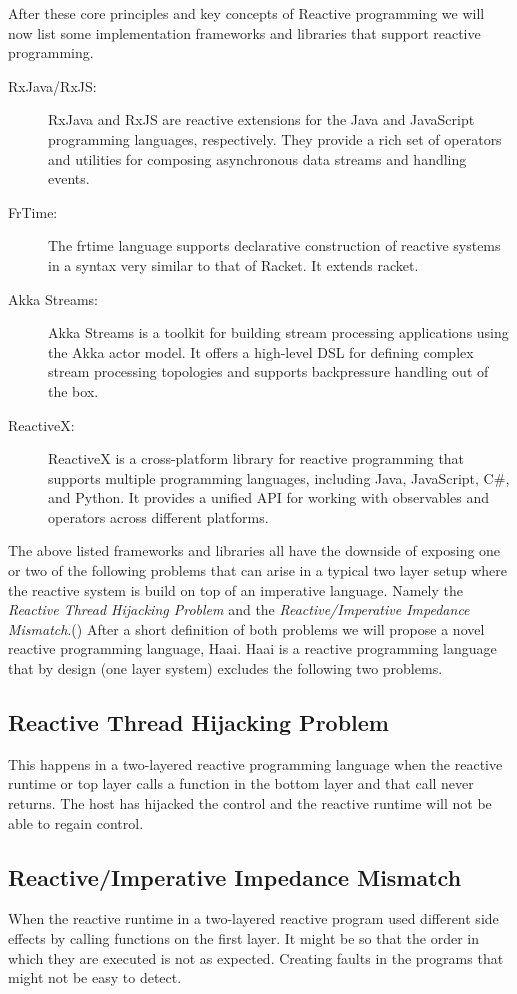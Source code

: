 \documentclass[a4paper]{book}
\begin{document}
After these core principles and key concepts of Reactive programming we will now list some implementation frameworks and libraries that support reactive programming. 

\begin{description}
	\item[RxJava/RxJS:] RxJava and RxJS are reactive extensions for the Java and JavaScript programming languages, respectively. They provide a rich set of operators and utilities for composing asynchronous data streams and handling events.
	\item[FrTime:] The frtime language supports declarative construction of reactive systems in a syntax very similar to that of Racket. It extends racket.
	\item[Akka Streams:] Akka Streams is a toolkit for building stream processing applications using the Akka actor model. It offers a high-level DSL for defining complex stream processing topologies and supports backpressure handling out of the box.
	\item[ReactiveX:] ReactiveX is a cross-platform library for reactive programming that supports multiple programming languages, including Java, JavaScript, C\#, and Python. It provides a unified API for working with observables and operators across different platforms.
\end{description} 

The above listed frameworks and libraries all have the downside of exposing one or two of the following problems that can arise in a typical two layer setup where the reactive system is build on top of an imperative language. Namely the \textit{Reactive Thread Hijacking Problem} and the \textit{Reactive/Imperative Impedance Mismatch}.(\cite{vonder_tackling_2020}) After a short definition of both problems we will propose a novel reactive programming language, Haai. Haai is a reactive programming language that by design (one layer system) excludes the following two problems.

\subsection*{Reactive Thread Hijacking Problem}
This happens in a two-layered reactive programming language when the reactive runtime or top layer calls a function in the bottom layer and that call never returns. The host has hijacked the control and the reactive runtime will not be able to regain control.  

\subsection*{Reactive/Imperative Impedance Mismatch}
When the reactive runtime in a two-layered reactive program used different side effects by calling functions on the first layer. It might be so that the order in which they are executed is not as expected. Creating faults in the programs that might not be easy to detect.
\end{document}
